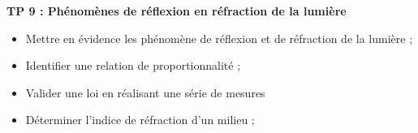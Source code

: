 
\renewcommand{\thesection}{\textcolor{red}{Partie \Roman{section} -}}
\renewcommand{\thesubsection}{\textcolor{red}{\Roman{section}.\arabic{subsection}}}
\renewcommand{\thesubsubsection}{\textcolor{red}{\Roman{section}.\arabic{subsection}.\alph{subsubsection}}}

\setcounter{section}{0}
\setcounter{document}{0}
\sndEnTeteTPNeuf

\begin{center}
\begin{mdframed}[style=titr, leftmargin=60pt, rightmargin=60pt, innertopmargin=7pt, innerbottommargin=7pt, innerrightmargin=8pt, innerleftmargin=8pt]

\begin{center}
\large{\textbf{TP 9 : Phénomènes de réflexion en réfraction de la lumière
}}
\end{center}
\end{mdframed}
\end{center}



\begin{tcolorbox}[colback=blue!5!white,colframe=blue!75!black,title=Objectifs de la séance :]
\begin{itemize}
    \item Mettre en évidence les phénomène de réflexion et de réfraction de la lumière ;
    \item Identifier une relation de proportionnalité ;
    \item Valider une loi en réalisant une série de mesures 
    \item Déterminer l'indice de réfraction d'un milieu ;
\end{itemize}
\end{tcolorbox}

